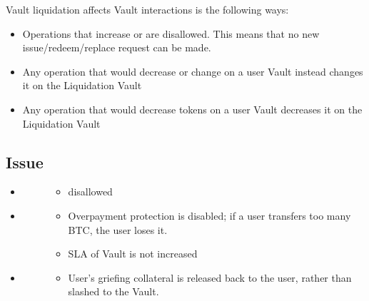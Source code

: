 \documentclass[a4paper,10pt,english]{sphinxmanual}
\begin{document}
Vault liquidation affects Vault interactions is the following ways:
\begin{itemize}
\item {} 
Operations that increase  or  are disallowed. This means that no new issue/redeem/replace request can be made.

\item {} 
Any operation that would decrease  or change  on a user Vault instead changes it on the Liquidation Vault

\item {} 
Any operation that would decrease  tokens on a user Vault  decreases it on the Liquidation Vault

\end{itemize}


\subsection{Issue}
\label{\detokenize{security_performance/liquidations:issue}}\begin{itemize}
\item {} \begin{description}
\item[{}] \leavevmode\begin{itemize}
\item {} 
disallowed

\end{itemize}

\end{description}

\item {} \begin{description}
\item[{}] \leavevmode\begin{itemize}
\item {} 
Overpayment protection is disabled; if a user transfers too many BTC, the user loses it.

\item {} 
SLA of Vault is not increased

\end{itemize}

\end{description}

\item {} \begin{description}
\item[{}] \leavevmode\begin{itemize}
\item {} 
User’s griefing collateral is released back to the user, rather than slashed to the Vault.

\end{itemize}

\end{description}

\end{itemize}
\end{document}
